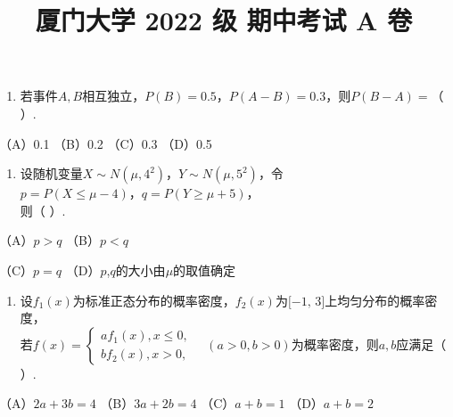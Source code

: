 \documentclass[fontset=exam]{exam-zh}
\title{厦门大学 2022 级 期中考试 A 卷}
\begin{document}
\maketitle
{}

\par{}\smallskip

\begin{enumerate}
\def\labelenumi{\arabic{enumi}.}
\item
  若事件\(A,B\)相互独立，\(P(B) = 0.5\text{，}\allowbreak P(A - B) = 0.3\)，则\(P(B - A) =\)（ ）.
\end{enumerate}

（A）0.1 （B）0.2 （C）0.3 （D）0.5

\begin{enumerate}
\def\labelenumi{\arabic{enumi}.}
\setcounter{enumi}{1}
\item
  设随机变量\(\left. X \right.\sim\left. N(\mu,4^{2})\text{，}\allowbreak Y \right.\sim N(\mu,5^{2})\)，令\(p = P(X \leq \mu - 4)\text{，}\allowbreak q = P(Y \geq \mu + 5)\)，\\
  则（ ）.
\end{enumerate}

（A）\(p > q\) （B）\(p < q\)

（C）\(p = q\) （D）\(p\),\(q\)的大小由\(\mu\)的取值确定

\begin{enumerate}
\def\labelenumi{\arabic{enumi}.}
\setcounter{enumi}{2}
\item
  设\(f_{1}(x)\)为标准正态分布的概率密度，\(f_{2}(x)\)为\(\lbrack - 1,\, 3\rbrack\)上均匀分布的概率密度，\\
  若\(f(x) = \left\{ \begin{array}{l}
  {af_{1}(x),x \leq 0,} \\
  {bf_{2}(x),x > 0,}
  \end{array} \right.\quad(a > 0,b > 0)\)为概率密度，则\(a,b\)应满足（ ）.
\end{enumerate}

（A）\(2a + 3b = 4\) （B）\(3a + 2b = 4\) （C）\(a + b = 1\) （D）\(a + b = 2\)
\end{document}
